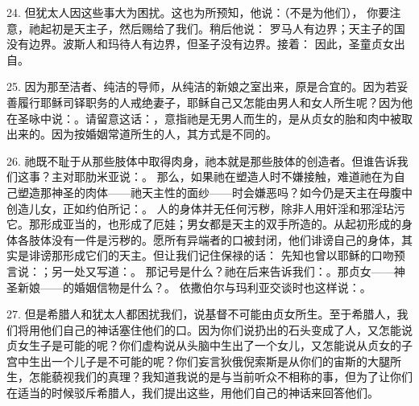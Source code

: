 24. 但犹太人因这些事大为困扰。这也为所预知，他说：（不是为他们），  你要注意，祂起初是天主子，然后赐给了我们。稍后他说： 罗马人有边界；天主子的国没有边界。波斯人和玛待人有边界，但圣子没有边界。接着： 因此，圣童贞女出自。\par

25. 因为那至洁者、纯洁的导师，从纯洁的新娘之室出来，原是合宜的。因为若妥善履行耶稣司铎职务的人戒绝妻子，耶稣自己又怎能由男人和女人所生呢？因为他在圣咏中说：。请留意这话：，意指祂是无男人而生的，是从贞女的胎和肉中被取出来的。因为按婚姻常道所生的人，其方式是不同的。\par

26. 祂既不耻于从那些肢体中取得肉身，祂本就是那些肢体的创造者。但谁告诉我们这事？主对耶肋米亚说：。 那么，如果祂在塑造人时不嫌接触，难道祂在为自己塑造那神圣的肉体——祂天主性的面纱——时会嫌恶吗？如今仍是天主在母腹中创造儿女，正如约伯所记：。 人的身体并无任何污秽，除非人用奸淫和邪淫玷污它。那形成亚当的，也形成了厄娃；男女都是天主的双手所造的。从起初形成的身体各肢体没有一件是污秽的。愿所有异端者的口被封闭，他们诽谤自己的身体，其实是诽谤那形成它们的天主。但让我们记住保禄的话： 先知也曾以耶稣的口吻预言说：；另一处又写道：。 那记号是什么？祂在后来告诉我们：。那贞女——神圣新娘——的婚姻信物是什么？。 依撒伯尔与玛利亚交谈时也这样说：。\par

27. 但是希腊人和犹太人都困扰我们，说基督不可能由贞女所生。至于希腊人，我们将用他们自己的神话塞住他们的口。因为你们说扔出的石头变成了人，又怎能说贞女生子是可能的呢？你们虚构说从头脑中生出了一个女儿，又怎能说从贞女的子宫中生出一个儿子是不可能的呢？你们妄言狄俄倪索斯是从你们的宙斯的大腿所生，怎能藐视我们的真理？我知道我说的是与当前听众不相称的事，但为了让你们在适当的时候驳斥希腊人，我们提出这些，用他们自己的神话来回答他们。\par

